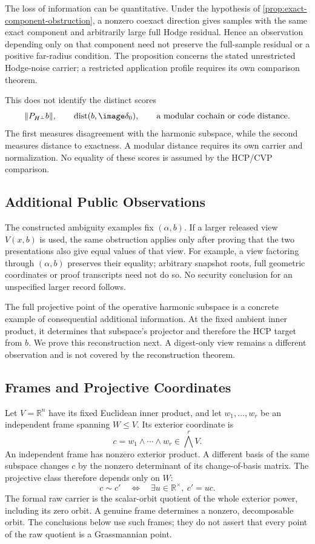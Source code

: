 The loss of information can be quantitative. Under the hypothesis of
\cref{prop:exact-component-obstruction}, a nonzero coexact direction gives
samples with the same exact component and arbitrarily large full Hodge
residual. Hence an observation depending only on that component need not
preserve the full-sample residual or a positive far-radius condition. The
proposition concerns the stated unrestricted Hodge-noise carrier; a
restricted application profile requires its own comparison theorem.

This does not identify the distinct scores
\[
  \|P_{H^\perp}b\|,\qquad
  \operatorname{dist}(b,\image\delta_0),\qquad
  \text{a modular cochain or code distance}.
\]
The first measures disagreement with the harmonic subspace, while the second
measures distance to exactness. A modular distance requires its own carrier and normalization. No equality
of these scores is assumed by the HCP/CVP comparison.

\subsection{Additional Public Observations}

The constructed ambiguity examples fix \((\alpha,b)\). If a larger released
view \(V(x,b)\) is used, the same obstruction applies only after proving
that the two presentations also give equal values of that view. For example,
a view factoring through \((\alpha,b)\) preserves their equality; arbitrary
snapshot roots, full geometric coordinates or proof transcripts need not do
so. No security conclusion for an unspecified larger record follows.

The full projective point of the operative harmonic subspace is a concrete
example of consequential additional information. At the fixed ambient inner
product, it determines that subspace's projector and therefore the HCP target
from \(b\). We prove this reconstruction next. A digest-only view remains a
different observation and is not covered by the reconstruction theorem.

\subsection{Frames and Projective Coordinates}

Let \(V=\mathbb R^n\) have its fixed Euclidean inner product, and let
\(w_1,\ldots,w_r\) be an independent frame spanning \(W\le V\). Its exterior
coordinate is
\[
  c=w_1\wedge\cdots\wedge w_r\in\bigwedge^r V.
\]
An independent frame has nonzero exterior product. A different basis of the
same subspace changes \(c\) by the nonzero determinant of its change-of-basis
matrix. The projective class therefore depends only on \(W\):
\[
 c\sim c'\quad\Longleftrightarrow\quad
 \exists u\in\mathbb R^\times,\ c'=uc.
\]
The formal raw carrier is the scalar-orbit quotient of the whole exterior
power, including its zero orbit. A genuine frame determines a nonzero,
decomposable orbit. The conclusions below use such frames; they do not
assert that every point of the raw quotient is a Grassmannian point.


